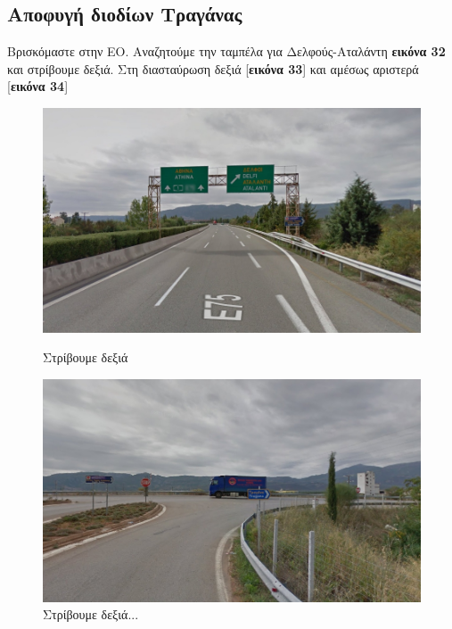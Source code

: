 \newpage
\begin{center}
\section*{Αποφυγή διοδίων Τραγάνας}
\end{center}
Βρισκόμαστε στην ΕΟ. Αναζητούμε την ταμπέλα για Δελφούς-Αταλάντη \textbf{εικόνα 32} και στρίβουμε δεξιά. Στη διασταύρωση δεξιά [\textbf{εικόνα 33}] και αμέσως αριστερά [\textbf{εικόνα 34}]
\begin{figure}[H]
\includegraphics[width=\textwidth]{images/lamia-athina/tragana/tragana_008.jpg}
\caption{Στρίβουμε δεξιά}
\includegraphics[width=\textwidth]{images/lamia-athina/tragana/tragana_009.jpg} 
\caption{Στρίβουμε δεξιά...}
\end{figure}
